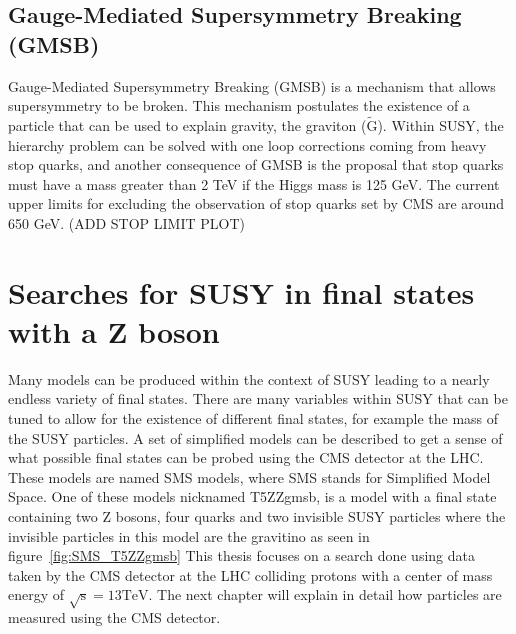 \subsection{Gauge-Mediated Supersymmetry Breaking (GMSB)}
Gauge-Mediated Supersymmetry Breaking (GMSB) is a mechanism that allows supersymmetry to be broken.
This mechanism postulates the existence of a particle that can be used to explain gravity, the graviton ($\mathrm{\tilde{G}}$).
Within SUSY, the hierarchy problem can be solved with one loop corrections coming from heavy stop quarks,
and another consequence of GMSB is the proposal that stop quarks must have a mass greater than 2 TeV if the Higgs mass is 125 GeV.
The current upper limits for excluding the observation of stop quarks set by CMS are around 650 GeV. (ADD STOP LIMIT PLOT)

\section{Searches for SUSY in final states with a Z boson}
\label{sec:signalmodel}
Many models can be produced within the context of SUSY leading to a nearly endless variety of final states.
There are many variables within SUSY that can be tuned to allow for the existence of different final states, for example the mass of the SUSY particles.
A set of simplified models can be described to get a sense of what possible final states can be probed using the CMS detector at the LHC.
These models are named SMS models, where SMS stands for Simplified Model Space.
One of these models nicknamed T5ZZgmsb, is a model with a final state containing two Z bosons,
four quarks and two invisible SUSY particles where the invisible particles in this model are the gravitino as seen in figure~\ref{fig:SMS_T5ZZgmsb}
This thesis focuses on a search done using data taken by the CMS detector at the LHC colliding protons with a center of mass energy of $\mathrm{\sqrt{s}=13 TeV}$.
The next chapter will explain in detail how particles are measured using the CMS detector.

